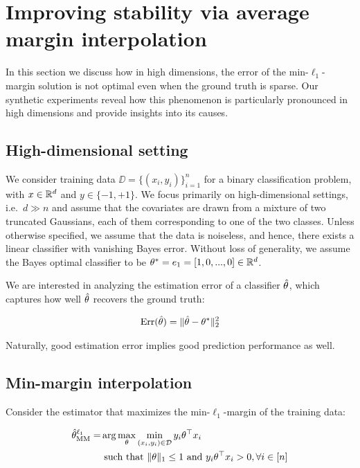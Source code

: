 \section{Improving stability via average margin interpolation}

In this section we discuss how in high dimensions, the error of the
min-$\ell_1$-margin solution is not optimal even when the ground truth is
sparse. Our synthetic experiments reveal how this phenomenon is particularly
pronounced in high dimensions and provide insights into its causes.

\subsection{High-dimensional setting}

We consider training data $\DD=\{(x_i, y_i)\}_{i=1}^{n}$ for a binary
classification problem, with $x\in \mathbb{R}^d$ and $y\in \{-1, +1\}$. We focus
primarily on high-dimensional settings, i.e.\ $d \gg n$ and assume that the
covariates are drawn from a mixture of two truncated Gaussians, each of them
corresponding to one of the two classes. Unless otherwise specified, we assume
that the data is noiseless, and hence, there exists a linear classifier with
vanishing Bayes error. Without loss of generality, we assume the Bayes optimal
classifier to be $\theta^*=e_1=[1, 0, ..., 0] \in \mathbb{R}^d$.

We are interested in analyzing the estimation error of a classifier $\hat{\theta}$,
which captures how well $\hat{\theta}$ recovers the ground truth:

\begin{align}
\text{Err}(\hat{\theta}) = \|\hat{\theta} - \theta^*\|_2^2 
\end{align}

Naturally, good estimation error implies good prediction performance as well.


\subsection{Min-margin interpolation}

Consider the estimator that maximizes the min-$\ell_1$-margin of the training
data:

\begin{align}
  \hat{\theta}^{\ell_1}_{\mathrm{MM}} =& \arg\max_{\theta} \min_{(x_i, y_i) \in \mathcal{D}} y_i\theta^\top x_i \\
  &\text{ such that }
  \|\theta\|_1 \le 1 \text{ and } y_i\theta^\top x_i > 0, \forall i \in [n]
\end{align}


